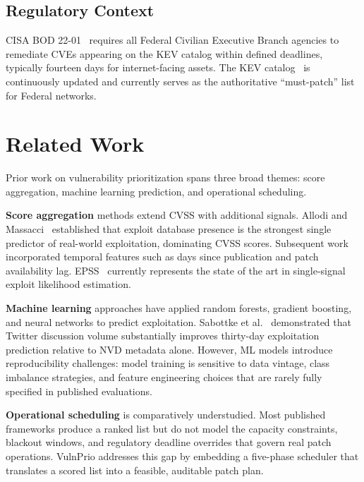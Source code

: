 \documentclass[journal]{IEEEtran}
\begin{document}
\subsection{Regulatory Context}

CISA BOD 22-01~\cite{cisa_bod2201} requires all Federal Civilian
Executive Branch agencies to remediate CVEs appearing on the KEV
catalog within defined deadlines, typically fourteen days for
internet-facing assets.  The KEV catalog~\cite{cisa_kev} is
continuously updated and currently serves as the authoritative
``must-patch'' list for Federal networks.

\section{Related Work}
\label{sec:related}

Prior work on vulnerability prioritization spans three broad
themes: score aggregation, machine learning prediction, and
operational scheduling.

\textbf{Score aggregation} methods extend CVSS with additional
signals.  Allodi and Massacci~\cite{allodi2014comparing} established
that exploit database presence is the strongest single predictor
of real-world exploitation, dominating CVSS scores.  Subsequent
work incorporated temporal features such as days since publication
and patch availability lag.  EPSS~\cite{jacobs2021epss} currently
represents the state of the art in single-signal exploit
likelihood estimation.

\textbf{Machine learning} approaches have applied random forests,
gradient boosting, and neural networks to predict exploitation.
Sabottke et al.~\cite{sabottke2015vulnerability} demonstrated
that Twitter discussion volume substantially improves
thirty-day exploitation prediction relative to NVD metadata alone.
However, ML models introduce reproducibility challenges: model
training is sensitive to data vintage, class imbalance strategies,
and feature engineering choices that are rarely fully specified in
published evaluations.

\textbf{Operational scheduling} is comparatively understudied.
Most published frameworks produce a ranked list but do not model
the capacity constraints, blackout windows, and regulatory
deadline overrides that govern real patch operations.  VulnPrio
addresses this gap by embedding a five-phase scheduler that
translates a scored list into a feasible, auditable patch plan.
\end{document}
